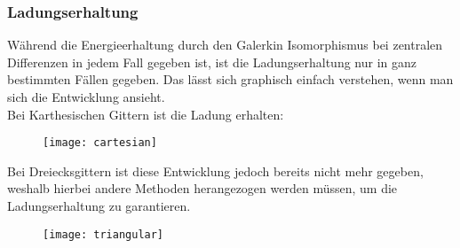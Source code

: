 \newpage


\subsubsection*{Ladungserhaltung}
W\"ahrend die Energieerhaltung durch den Galerkin Isomorphismus bei zentralen Differenzen in jedem Fall gegeben ist, ist die Ladungserhaltung nur in ganz bestimmten F\"allen gegeben. Das l\"asst sich graphisch einfach verstehen, wenn man sich die Entwicklung ansieht.\\
Bei Karthesischen Gittern ist die Ladung erhalten:
\par
\begin{figure}[ht]
	\centering
	\texttt{[image: cartesian]}
\end{figure}
Bei Dreiecksgittern ist diese Entwicklung jedoch bereits nicht mehr gegeben, weshalb hierbei andere Methoden herangezogen werden m\"ussen, um die Ladungserhaltung zu garantieren.
\begin{figure}[ht]
	\centering
	\texttt{[image: triangular]}
\end{figure}



